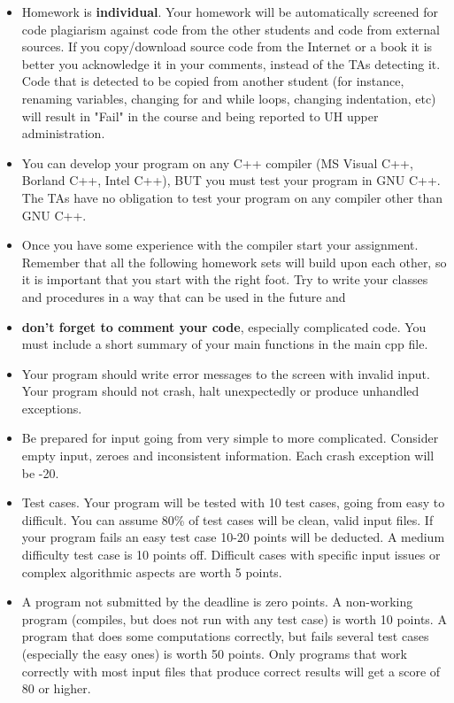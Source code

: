 \begin{itemize}
\item Homework is {\bf individual}. Your homework will be automatically screened for code plagiarism
against code from the other students and code from external sources.
If you copy/download source code from the Internet or a book it is better
you acknowledge it in your comments, instead of the TAs detecting it. 
Code that is detected to be copied from another student 
(for instance, renaming variables, changing for and while loops, changing indentation, etc)
will result in "Fail" in the course and being reported to UH upper administration.

\item You can develop your program on any C++ compiler (MS Visual C++, Borland C++, Intel C++), BUT
you must test your program in GNU C++. The TAs have no obligation to test your program on any compiler
other than GNU C++.


\item Once you have some experience with the compiler start your assignment. Remember that all the following homework sets will build upon each other, so it is important that you start with the right foot. 
Try to write your classes and procedures in a way that can be used in the future and 


\item \textbf{don't forget to comment your code}, especially complicated code.
You must include a short summary of your main functions in the main cpp file.


\item Your program should write error messages to the screen with invalid input.
Your program should not crash, halt unexpectedly or produce 
unhandled exceptions. 

\item Be prepared for input going from very simple to more complicated.
Consider empty input, zeroes and inconsistent information.
Each crash exception will be -20. 


\item Test cases.
Your program will be tested with 10 test cases, going from easy to difficult.
You can assume 80\% of test cases will be clean, valid input files.
If your program fails an easy test case 10-20 points will be deducted.
A medium difficulty test case is 10 points off.
Difficult cases with specific input issues or complex algorithmic aspects are worth 5 points.

\item A program not submitted by the deadline is zero points.
A non-working program (compiles, but does not run with any test case) is worth 10 points.
A program that does some computations correctly, but fails several test cases (especially the easy ones) 
is worth 50 points.
Only programs that work correctly with most input files that produce correct results
will get a score of 80 or higher. 


\end{itemize}
